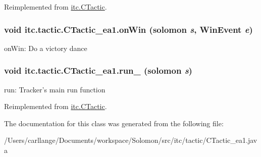 Reimplemented from \hyperlink{classitc_1_1_c_tactic_a63a5a64ff30293061e37eca71fb77a96}{itc.CTactic}.\hypertarget{classitc_1_1tactic_1_1_c_tactic__ea1_a796f0c1b21f72300fbbd7cbccc6ef610}{
\subsubsection[{onWin}]{\setlength{\rightskip}{0pt plus 5cm}void itc.tactic.CTactic\_\-ea1.onWin ({\bf solomon} {\em s}, \/  WinEvent {\em e})}}
\label{classitc_1_1tactic_1_1_c_tactic__ea1_a796f0c1b21f72300fbbd7cbccc6ef610}
onWin: Do a victory dance \hypertarget{classitc_1_1tactic_1_1_c_tactic__ea1_ad3c677f7d3fbb5b88ebac50cd465a3cf}{
\subsubsection[{run\_\-}]{\setlength{\rightskip}{0pt plus 5cm}void itc.tactic.CTactic\_\-ea1.run\_\- ({\bf solomon} {\em s})}}
\label{classitc_1_1tactic_1_1_c_tactic__ea1_ad3c677f7d3fbb5b88ebac50cd465a3cf}
run: Tracker's main run function 

Reimplemented from \hyperlink{classitc_1_1_c_tactic_ae5f5c51a6e04d22bc298dbdec4080770}{itc.CTactic}.

The documentation for this class was generated from the following file:\begin{DoxyCompactItemize}
\item 
/Users/carllange/Documents/workspace/Solomon/src/itc/tactic/CTactic\_\-ea1.java\end{DoxyCompactItemize}
